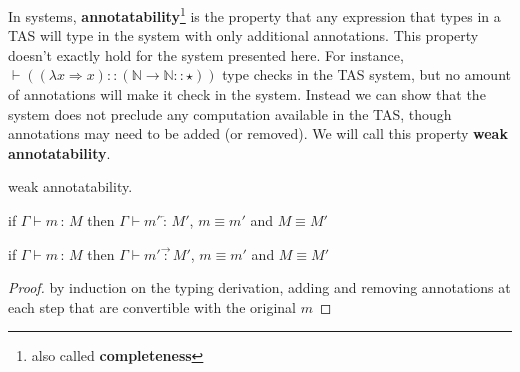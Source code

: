 In \bidir{} systems, \textbf{annotatability}\footnote{also called \textbf{completeness}} is the property that any expression that types in a \ac{TAS} will type in the \bidir{} system with only additional annotations.
This property doesn't exactly hold for the \bidir{} system presented here.
For instance, $\vdash\left((\lambda x\Rightarrow x)::\left(\mathbb{N}\rightarrow\mathbb{N}::\star\right)\right)$ type checks in the \ac{TAS} system, but no amount of annotations will make it check in the \bidir{} system.
Instead we can show that the \bidir{} system does not preclude any computation available in the \ac{TAS}, though annotations may need to be added (or removed).%
We will call this property \textbf{weak annotatability}.
\begin{thm}
weak annotatability.
 
if $\Gamma\vdash m\,:\,M$ then $\Gamma\vdash m'\overleftarrow{\,:\,}M'$, $m\equiv m'$ and $M\equiv M'$
 
if $\Gamma\vdash m\,:\,M$ then $\Gamma\vdash m'\overrightarrow{\,:\,}M'$, $m\equiv m'$ and $M\equiv M'$
\end{thm}
 
\begin{proof}
by induction on the typing derivation, adding and removing annotations at each step that are convertible with the original $m$
\end{proof}
